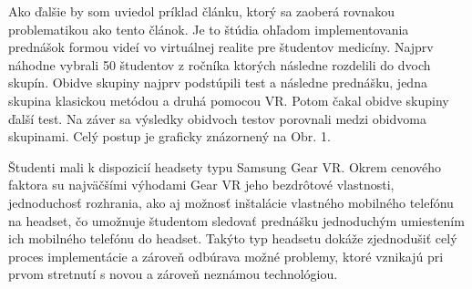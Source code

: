 \par \qquad Ako ďalšie by som uviedol príklad článku, ktorý sa zaoberá
rovnakou problematikou ako tento článok. Je to štúdia ohľadom implementovania 
prednášok formou videí vo virtuálnej realite pre študentov medicíny. Najprv náhodne 
vybrali 50 študentov z ročníka ktorých následne rozdelili do dvoch skupín. Obidve 
skupiny najprv podstúpili test a následne prednášku, jedna skupina 
klasickou metódou a druhá pomocou VR. Potom čakal obidve skupiny ďalší test. Na záver 
sa výsledky obidvoch testov porovnali medzi obidvoma skupinami. Celý postup je graficky
znázornený na Obr. 1.
\par Študenti mali k dispozicií headsety typu Samsung Gear VR. Okrem cenového faktora su
najväčšími výhodami Gear VR jeho bezdrôtové vlastnosti, jednoduchosť rozhrania, ako aj 
možnosť inštalácie vlastného mobilného telefónu na headset, čo umožnuje študentom
sledovať prednášku jednoduchým umiestením ich mobilného telefónu do headset. Takýto typ headsetu
dokáže zjednodušiť
celý proces implementácie a zároveň odbúrava možné problemy, ktoré vznikajú pri prvom stretnutí
s novou a zároveň neznámou technológiou.\citep{Zdroj5}